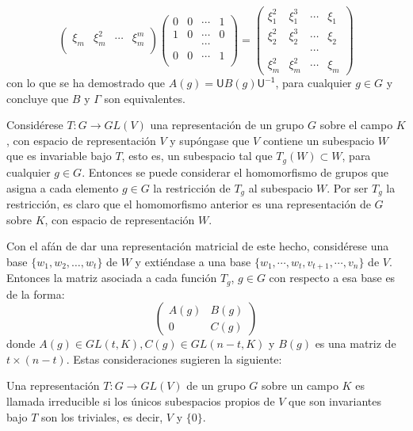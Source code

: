 \begin{ejemplo}
\begin{equation*}
\begin{pmatrix}
 \xi_m & \xi_m^2 & \cdots & \xi_m^m \\
\end{pmatrix}
\begin{pmatrix}
0 & 0 & \cdots & 1 \\
1 & 0 & \cdots & 0 \\
 & & \cdots & \\
0 & 0 & \cdots & 1 \\
\end{pmatrix} = \begin{pmatrix}
\xi_1^2 & \xi_1^3 & \cdots & \xi_1 \\
\xi_2^2 & \xi_2^3 & \cdots & \xi_2 \\
 & & \cdots & \\
\xi_m^2 & \xi_m^2 & \cdots & \xi_m
\end{pmatrix}
\end{equation*} con lo que se ha demostrado que $A(g) = \mathsf{U}B(g)\mathsf{U^{-1}}$, para cualquier $g \in G$ y concluye que $B$ y $\Gamma$ son equivalentes. 
\end{ejemplo}

Considérese $T \colon G \to GL(V)$ una representación de un grupo $G$ sobre el campo $K$, con espacio de representación $V$ y supóngase que $V$ contiene un subespacio $W$ que es invariable bajo $T$, esto es, un subespacio tal que $T_g(W) \subset W$, para cualquier $g \in G$. Entonces se puede considerar el homomorfismo de grupos que asigna a cada elemento $g \in G$ la restricción de $T_g$ al subespacio $W$. Por ser $T_g$ la restricción, es claro que el homomorfismo anterior es una representación de $G$ sobre $K$, con espacio de representación $W$.

Con el afán de dar una representación matricial de este hecho, considérese una base $\{ w_1, w_2, \dots, w_t \}$ de $W$ y extiéndase a una base $ \{ w_1, \cdots, w_t, v_{t+1}, \cdots, v_n \}$ de $V$. Entonces la matriz asociada a cada función $T_g$, $g \in G$ con respecto a esa base es de la forma:
\begin{equation*} \begin{pmatrix}
A(g) & B(g) \\
0 & C(g)
\end{pmatrix} \end{equation*} donde $A(g) \in GL(t,K), C(g) \in GL(n-t,K)$ y $B(g)$ es una matriz de $t \times (n-t)$. Estas consideraciones sugieren la siguiente:
\begin{definicion}
Una representación $T \colon G \to GL(V)$ de un grupo $G$ sobre un campo $K$ es llamada irreducible si los únicos subespacios propios de $V$ que son invariantes bajo $T$ son los triviales, es decir, $V$ y $\{ 0 \}$.
\end{definicion}

